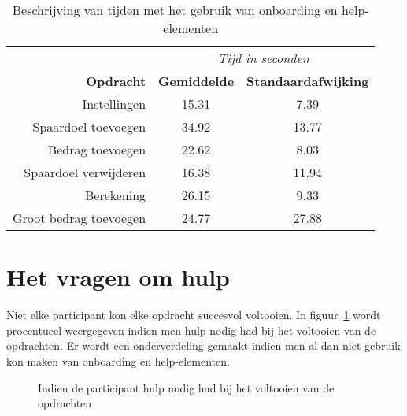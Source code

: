 \begin{table}[h]
    \centering
    \begin{tabular}{rcc}
        \multicolumn{1}{l}{} & \multicolumn{2}{c}{\textit{Tijd in seconden}} \\
        \multicolumn{1}{r|}{\textbf{Opdracht}} & \textbf{Gemiddelde} & \textbf{Standaardafwijking} \\ \hline
        \multicolumn{1}{r|}{Instellingen} & 15.31 & 7.39 \\
        \multicolumn{1}{r|}{Spaardoel toevoegen} & 34.92 & 13.77 \\
        \multicolumn{1}{r|}{Bedrag toevoegen} & 22.62 & 8.03 \\
        \multicolumn{1}{r|}{Spaardoel verwijderen} & 16.38 & 11.94 \\
        \multicolumn{1}{r|}{Berekening} & 26.15 & 9.33 \\
        \multicolumn{1}{r|}{Groot bedrag toevoegen} & 24.77 & 27.88
    \end{tabular}
    \caption{Beschrijving van tijden met het gebruik van onboarding en help-elementen}
    \label{tab:beschrijving-tijden-met-elementen}
\end{table}

\section{Het vragen om hulp}
\label{sec:vragen-hulp}

Niet elke participant kon elke opdracht succesvol voltooien. In figuur~\ref{fig:beschrijving-hulp} wordt procentueel weergegeven indien men hulp nodig had bij het voltooien van de opdrachten. Er wordt een onderverdeling gemaakt indien men al dan niet gebruik kon maken van onboarding en help-elementen.

\begin{figure}[h]
    \centering
    \qquad
    \qquad
    \qquad
    \qquad
    \qquad
    \caption{Indien de participant hulp nodig had bij het voltooien van de opdrachten}
    \label{fig:beschrijving-hulp}
\end{figure}

